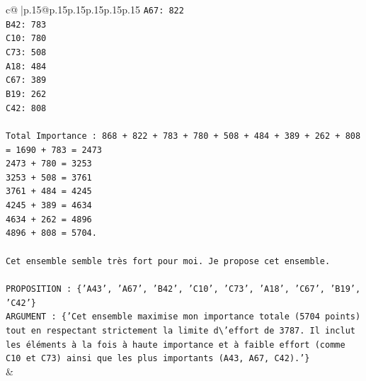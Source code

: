 \documentclass{article}
\begin{document}
{\begin{supertabular}{c@{$\;$}|p{.15\linewidth}@{}p{.15\linewidth}p{.15\linewidth}p{.15\linewidth}p{.15\linewidth}p{.15\linewidth}}
{{{\texttt{A67: 822} \\
\texttt{B42: 783} \\
\texttt{C10: 780} \\
\texttt{C73: 508} \\
\texttt{A18: 484} \\
\texttt{C67: 389} \\
\texttt{B19: 262} \\
\texttt{C42: 808} \\
\\ 
\texttt{Total Importance : 868 + 822 + 783 + 780 + 508 + 484 + 389 + 262 + 808} \\
\texttt{= 1690 + 783 = 2473} \\
\texttt{2473 + 780 = 3253} \\
\texttt{3253 + 508 = 3761} \\
\texttt{3761 + 484 = 4245} \\
\texttt{4245 + 389 = 4634} \\
\texttt{4634 + 262 = 4896} \\
\texttt{4896 + 808 = 5704.} \\
\\ 
\texttt{Cet ensemble semble très fort pour moi. Je propose cet ensemble.} \\
\\ 
\texttt{PROPOSITION : \{'A43', 'A67', 'B42', 'C10', 'C73', 'A18', 'C67', 'B19', 'C42'\}} \\
\texttt{ARGUMENT : \{'Cet ensemble maximise mon importance totale (5704 points) tout en respectant strictement la limite d\textbackslash{}'effort de 3787. Il inclut les éléments à la fois à haute importance et à faible effort (comme C10 et C73) ainsi que les plus importants (A43, A67, C42).'\}} \\
            }
        }
    }
    & \\ \\


\end{supertabular}}
\end{document}
